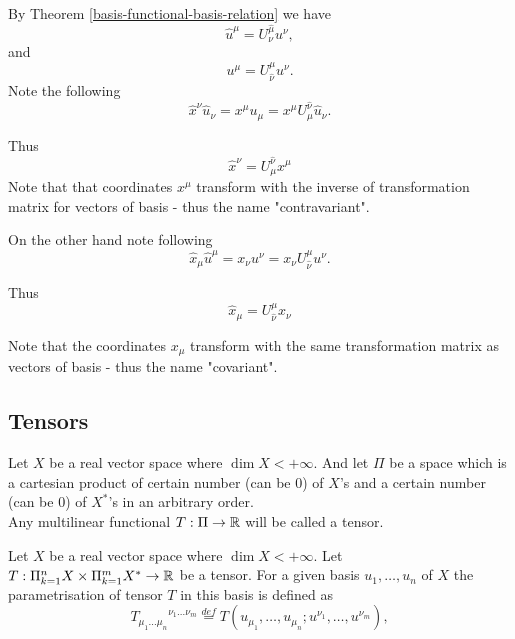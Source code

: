 \documentclass[main.tex]{subfiles}
\begin{document}
By Theorem \ref{basis-functional-basis-relation} we have
\begin{equation}
\hat{u}^\mu =  U^{\hat{\mu}}_{\nu} u^\nu,
\end{equation}
and 
\begin{equation}
u^\mu = U^{\mu}_{\hat{\nu}} u^\nu.
\end{equation}
Note the following
\begin{equation}
\hat{x}^\nu \hat{u}_\nu = x^\mu u_\mu = x^\mu U^{\hat{\nu}}_\mu  \hat{u}_\nu.
\end{equation}

Thus
\begin{equation}
\boxed{
\hat{x}^\nu = U^{\hat{\nu}}_\mu x^\mu 
}
\end{equation}
Note that that coordinates $x^\mu$ transform with the inverse of transformation matrix for vectors of basis - thus the name "contravariant".

On the other hand note following
\begin{equation}
\hat{x}_\mu \hat{u}^\mu = x_\nu u^\nu = x_\nu U^{\mu}_{\hat{\nu}} u^\nu.
\end{equation}

Thus
\begin{equation}
\boxed{
\hat{x}_\mu = U^{\mu}_{\hat{\nu}} x_\nu}
\end{equation}

Note that the coordinates $x_\mu$ transform with the same transformation matrix as vectors of basis - thus the name "covariant".

\subsection{Tensors}

\begin{definition}
Let $X$ be a real vector space where $\dim X < +\infty$. And let $\Pi$ be a space which is a cartesian product of certain number (can be 0) of $X$'s and a certain number (can be 0) of $X^*$'s in an arbitrary order.\\

\noindent
Any multilinear functional $T:\Pi\to\mathbb{R}$ will be called a tensor. 
\end{definition}

Let $X$ be a real vector space where $\dim X < +\infty$.
Let $T:\Pi_{k=1}^n X \times \Pi_{k=1}^m X^*\to\mathbb{R}$ be a tensor. For a given basis $u_1, \dots, u_n$ of $X$ the parametrisation of tensor $T$ in this basis is defined as
\begin{equation}
\label{tensor-parametrisation}
{T_{\mu_1\dots\mu_n}}^{\nu_1\dots\nu_m} \stackrel{def}{=} 
T(u_{\mu_1}, \dots, u_{\mu_n}; u^{\nu_1}, \dots, u^{\nu_m}),
\end{equation} 
\end{document}
